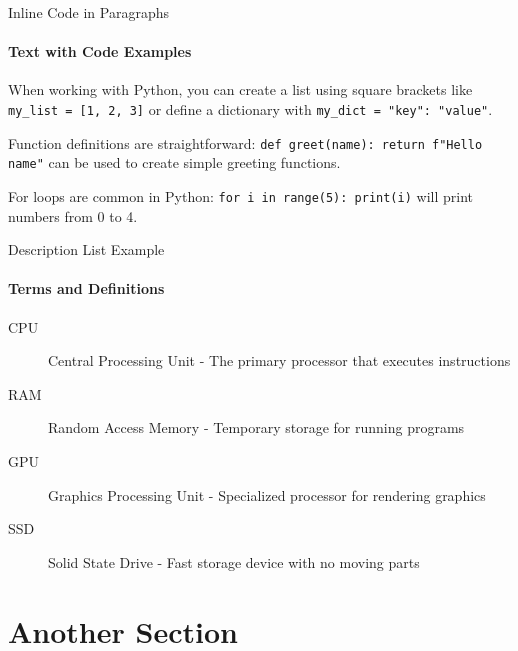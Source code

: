 \documentclass[10pt,aspectratio=169]{beamer}
\begin{document}
\begin{frame}{Inline Code in Paragraphs}
    \framesubtitle{Text with Code Examples}
    
    When working with Python, you can create a list using square brackets like 
    \texttt{my_list = [1, 2, 3]} or define a dictionary with 
    \texttt{my_dict = {"key": "value"}}.
    
    \medskip
    
    Function definitions are straightforward: \texttt{def greet(name): return f"Hello {name}"}
    can be used to create simple greeting functions.
    
    \medskip
    
    For loops are common in Python: \texttt{for i in range(5): print(i)} will print
    numbers from 0 to 4.
\end{frame}

\begin{frame}{Description List Example}
    \framesubtitle{Terms and Definitions}
    \begin{description}
        \item[CPU] Central Processing Unit - The primary processor that executes instructions
        \item[RAM] Random Access Memory - Temporary storage for running programs
        \item[GPU] Graphics Processing Unit - Specialized processor for rendering graphics
        \item[SSD] Solid State Drive - Fast storage device with no moving parts
    \end{description}
\end{frame}

\section{Another Section}
\end{document}
